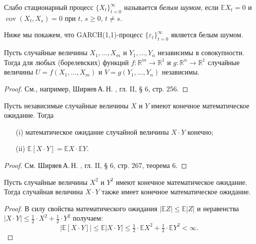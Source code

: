 \begin{Definition}
Слабо стационарный процесс $\{X_t\}_{t=0}^\infty$ называется \textit{белым шумом}, если $\mathbb{E}{X_t} = 0$ и $\operatorname{cov}(X_t,X_s) = 0$ при $t, \,s \geq 0$, $t \neq s$.
\end{Definition}

Ниже мы покажем, что GARCH(1,1)-процесс $\{\varepsilon_t\}_{t=0}^{\infty}$ является белым шумом.

\begin{Lemma}\label{GARCH Lemma 1}
Пусть случайные величины $X_1, \ldots, X_m$ и $Y_1, \ldots, Y_n$ независимы в совокупности. Тогда для любых (борелевских) функций $f \colon \mathbb{R}^m \to \mathbb{R}^1$ и $g \colon \mathbb{R}^n \to \mathbb{R}^1$ случайные величины $U = f(X_1, \ldots, X_m)$ и $V = g(Y_1, \ldots, Y_n)$ независимы.
\end{Lemma}
\begin{proof}
См., например, Ширяев\,А.\,Н. \cite{Shiryaev_Prob}, гл. II, § 6, стр. 256.
\end{proof}

\begin{Lemma}\label{GARCH Lemma 2}
Пусть независимые случайные величины $X$ и $Y$ имеют конечное математическое ожидание. Тогда
\begin{itemize}
  \item[(i)] математическое ожидание случайной величины ${X}\cdot{Y}$ конечно;
  \item[(ii)] $\mathbb{E}[{X}\cdot{Y}] = \mathbb{E}{X}\cdot\mathbb{E}{Y}$.
\end{itemize}
\end{Lemma}

\begin{proof}
См. Ширяев\,А.\,Н. \cite{Shiryaev_Prob}, гл. II, § 6, стр. 267, теорема 6.
\end{proof}

\begin{Lemma}\label{GARCH Lemma 3}
Пусть случайные величины $X^2$ и $Y^2$ имеют конечное математическое ожидание. Тогда случайная величина $X \cdot Y$ также имеет конечное математическое ожидание.
\end{Lemma}

\begin{proof}
В силу свойства математического ожидания $|\mathbb{E}Z| \leq \mathbb{E}|Z|$ и неравенства $|X \cdot Y| \leq \tfrac{1}{2} \cdot X^2 + \tfrac{1}{2} \cdot Y^2$ получаем:
\[
    |\mathbb{E}[X \cdot Y]| \leq \mathbb{E}|X \cdot Y| \leq \tfrac{1}{2} \cdot \mathbb{E}X^2 + \tfrac{1}{2} \cdot \mathbb{E}Y^2 < \infty \text{.}
\]
\end{proof}

